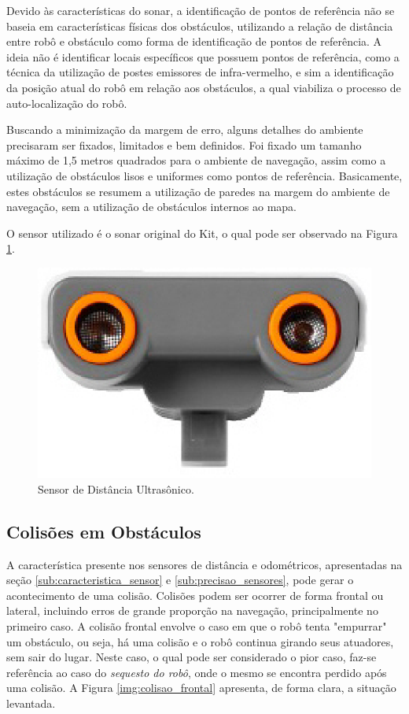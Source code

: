   Devido às características do sonar, a identificação de pontos de referência não se baseia em características físicas dos obstáculos,
  utilizando a relação de distância entre robô e obstáculo como forma de identificação de pontos de referência. A ideia não é
  identificar locais específicos que possuem pontos de referência, como a técnica da utilização de postes emissores de infra-vermelho,
  e sim a identificação da posição atual do robô em relação aos obstáculos, a qual viabiliza o processo de auto-localização do robô.

  Buscando a minimização da margem de erro, alguns detalhes do ambiente precisaram ser fixados, limitados e bem definidos. Foi fixado
  um tamanho máximo de 1,5 metros quadrados para o ambiente de navegação, assim como a utilização de obstáculos lisos e uniformes como
  pontos de referência. Basicamente, estes obstáculos se resumem a utilização de paredes na margem do ambiente de navegação, sem a utilização
  de obstáculos internos ao mapa.

  O sensor utilizado é o sonar original do Kit, o qual pode ser observado na Figura \ref{img:sonar_utilizado}.

  \begin{figure}[H]
    \centering
    \includegraphics[scale=0.5]{figuras/ultrasonic.eps}
    \caption{Sensor de Distância Ultrasônico.}
    \label{img:sonar_utilizado}
  \end{figure}


\subsection{Colisões em Obstáculos}
\label{sub:colisao}

A característica presente nos sensores de distância e odométricos, apresentadas na seção \ref{sub:caracteristica_sensor} e
\ref{sub:precisao_sensores}, pode gerar o acontecimento de uma colisão. Colisões podem ser ocorrer de forma frontal ou lateral,
incluindo erros de grande proporção na navegação, principalmente no primeiro caso. A colisão frontal envolve o caso em que o robô
tenta "empurrar" um obstáculo, ou seja, há uma colisão e o robô continua girando seus atuadores, sem sair do lugar. Neste caso,
o qual pode ser considerado o pior caso, faz-se referência ao caso do \textit{sequesto do robô}, onde o mesmo se encontra perdido
após uma colisão. A Figura \ref{img:colisao_frontal} apresenta, de forma clara, a situação levantada.

